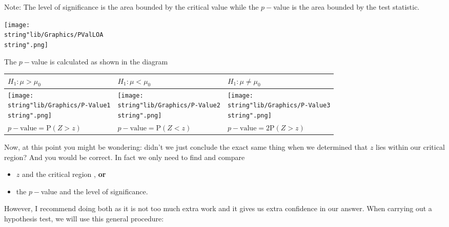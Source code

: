 \documentclass[11pt,a4paper]{book}
\begin{document}
\medskip

Note: The level of significance is the area bounded by the critical
value while the $p-$value is the area bounded by the test statistic.
\begin{center}
\texttt{[image: \\string"lib/Graphics/PValLOA\\string".png]}
\par\end{center}

\newpage

The $p-$value is calculated as shown in the diagram

\medskip

\setlength{\extrarowheight}{2pt}%
\begin{tabular}{|>{\centering}p{5cm}|>{\centering}p{5cm}|>{\centering}p{5cm}|}
\hline
$H_{1}:\mu>\mu_{0}$ & $H_{1}:\mu<\mu_{0}$ & $H_{1}:\mu\neq\mu_{0}$\tabularnewline
\hline
\centering{}\texttt{[image: \\string"lib/Graphics/P-Value1\\string".png]} & \centering{}\texttt{[image: \\string"lib/Graphics/P-Value2\\string".png]} & \centering{}\texttt{[image: \\string"lib/Graphics/P-Value3\\string".png]}\tabularnewline
\hline
$p-\text{value}=\text{P}\left(Z>z\right)$ & $p-\text{value}=\text{P}\left(Z<z\right)$ & $p-\text{value}=2\text{P}\left(Z>z\right)$\tabularnewline
\hline
\end{tabular}

\bigskip

Now, at this point you might be wondering: didn't we just conclude
the exact same thing when we determined that $z$ lies within our
critical region? And you would be correct. In fact we only need to
find and compare
\begin{itemize}
\item $z$ and the critical region , \textbf{or}
\item the $p-$value and the level of significance.
\end{itemize}
However, I recommend doing both as it is not too much extra work
and it gives us extra confidence in our answer. When carrying out a hypothesis test, we will use this general procedure:

\medskip
\end{document}
